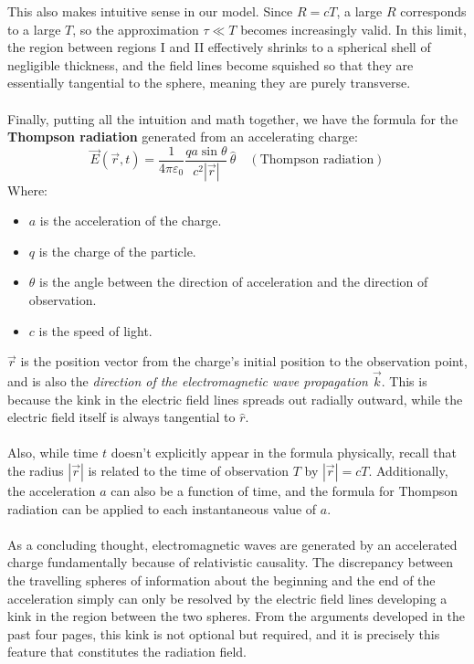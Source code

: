 \documentclass[12pt]{article}
\begin{document}
This also makes intuitive sense in our model. Since $R = cT$, a large $R$ corresponds to a large $T$, so the approximation $\tau \ll T$ becomes increasingly valid. In this limit, the region between regions I and II effectively shrinks to a spherical shell of negligible thickness, and the field lines become squished so that they are essentially tangential to the sphere, meaning they are purely transverse.\\\\
Finally, putting all the intuition and math together, we have the formula for the \textbf{Thompson radiation} generated from an accelerating charge:
\[\boxed{\vec{E}(\vec{r},t) = \frac{1}{4\pi\varepsilon_0} \frac{qa\sin\theta}{c^2|\vec{r}|}\,\hat{\theta}\quad (\text{Thompson radiation})}\]
Where:
\begin{itemize}
    \item $a$ is the acceleration of the charge.
    \item $q$ is the charge of the particle.
    \item $\theta$ is the angle between the direction of acceleration and the direction of observation.
    \item $c$ is the speed of light.
\end{itemize}
$\vec{r}$ is the position vector from the charge's initial position to the observation point, and is also the \textit{direction of the electromagnetic wave propagation $\vec{k}$}. This is because the kink in the electric field lines spreads out radially outward, while the electric field itself is always tangential to $\hat{r}$.\\\\
Also, while time $t$ doesn't explicitly appear in the formula physically, recall that the radius $|\vec{r}|$ is related to the time of observation $T$ by $|\vec{r}|=cT$. Additionally, the acceleration $a$ can also be a function of time, and the formula for Thompson radiation can be applied to each instantaneous value of $a$.\\\\
As a concluding thought, electromagnetic waves are generated by an accelerated charge fundamentally because of relativistic causality. The discrepancy between the travelling spheres of information about the beginning and the end of the acceleration simply can only be resolved by the electric field lines developing a kink in the region between the two spheres. From the arguments developed in the past four pages, this kink is not optional but required, and it is precisely this feature that constitutes the radiation field.\\\\
\end{document}

